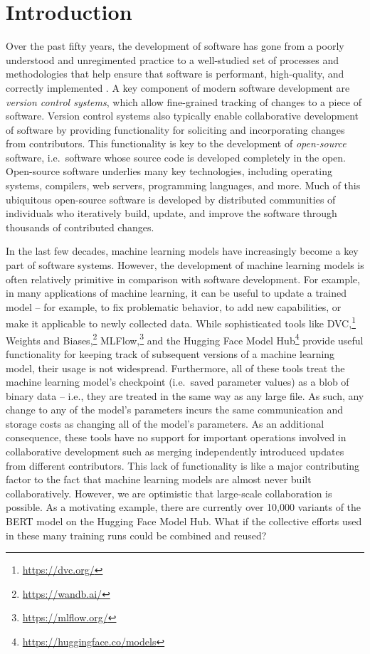 \section{Introduction}

Over the past fifty years, the development of software has gone from a poorly understood and unregimented practice to a well-studied set of processes and methodologies that help ensure that software is performant, high-quality, and correctly implemented \citep{brooks1975mythical}.
A key component of modern software development are \textit{version control systems}, which allow fine-grained tracking of changes to a piece of software.
Version control systems also typically enable collaborative development of software by providing functionality for soliciting and incorporating changes from contributors.
This functionality is key to the development of \textit{open-source} software, i.e.\ software whose source code is developed completely in the open.
Open-source software underlies many key technologies, including operating systems, compilers, web servers, programming languages, and more.
Much of this ubiquitous open-source software is developed by distributed communities of individuals who iteratively build, update, and improve the software through thousands of contributed changes.

In the last few decades, machine learning models have increasingly become a key part of software systems.
However, the development of machine learning models is often relatively primitive in comparison with software development.
For example, in many applications of machine learning, it can be useful to update a trained model -- for example, to fix problematic behavior, to add new capabilities, or make it applicable to newly collected data.
While sophisticated tools like DVC,\footnote{\url{https://dvc.org/}} Weights and Biases,\footnote{\url{https://wandb.ai/}} MLFlow,\footnote{\url{https://mlflow.org/}} and the Hugging Face Model Hub\footnote{\url{https://huggingface.co/models}} provide useful functionality for keeping track of subsequent versions of a machine learning model, their usage is not widespread.
Furthermore, all of these tools treat the machine learning model's checkpoint (i.e.\ saved parameter values) as a blob of binary data -- i.e., they are treated in the same way as any large file.
As such, any change to any of the model's parameters incurs the same communication and storage costs as changing all of the model's parameters.
As an additional consequence, these tools have no support for important operations involved in collaborative development such as merging independently introduced updates from different contributors.
This lack of functionality is like a major contributing factor to the fact that machine learning models are almost never built collaboratively.
However, we are optimistic that large-scale collaboration is possible. 
As a motivating example, there are currently over 10,000 variants of the BERT model on the Hugging Face Model Hub.
What if the collective efforts used in these many training runs could be combined and reused?

